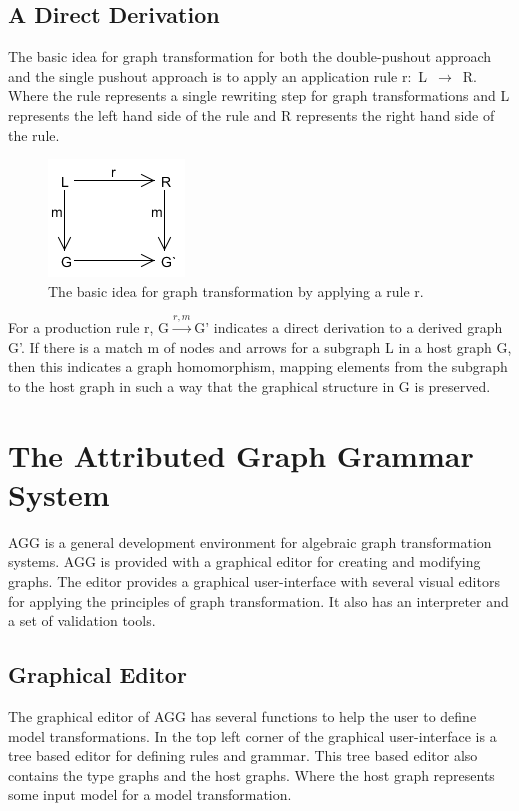 \documentclass[pdftex,11pt,a4paper]{article}
\begin{document}
\subsection{A Direct Derivation}
\noindent The basic idea for graph transformation for both the double-pushout
approach and the single pushout approach is to apply an application rule
\mbox{r: L $\longrightarrow$ R}. Where the rule represents a single rewriting
step for graph transformations and L represents the left hand side of the rule and R
represents the right hand side of the rule.

\begin{figure}[H]
	\centering
	\includegraphics[scale=0.7]{figures/GraphTransformationGeneral.png}
	\caption{The basic idea for graph transformation by applying a rule r.}
	\label{fig:GraphTransformationGeneral}
\end{figure}

For a production rule r, \mbox{G$\xrightarrow{r,m}$G'} indicates a direct
derivation to a derived graph G'. If there is a match m of nodes and arrows for a
subgraph L in a host graph G, then this indicates a graph homomorphism, mapping
elements from the subgraph to the host graph in such a way that the graphical
structure in G is preserved.

\section{The Attributed Graph Grammar System}

\noindent AGG is a general development environment for algebraic graph
transformation systems. AGG is provided with a graphical editor for creating
and modifying graphs. The editor provides a graphical user-interface with
several visual editors for applying the principles of graph transformation. It
also has an interpreter and a set of validation tools.

\subsection{Graphical Editor}
\noindent The graphical editor of AGG has several functions to help the user to
define model transformations. In the top left corner of the graphical user-interface is
a tree based editor for defining rules and grammar. This tree based editor also
contains the type graphs and the host graphs. Where the host graph represents
some input model for a model transformation.
\end{document}
